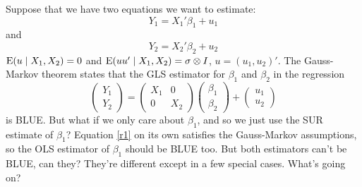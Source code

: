 \begin{hw}
  Suppose that we have two equations we want to estimate:
  \begin{equation}
    \label{r1}
    Y_1 = X_1 '\beta_1 + u_1
  \end{equation}
  and
  \begin{equation}
    \label{r2}
    Y_2 = X_2'\beta_2 + u_2
  \end{equation}
  $\operatorname{E}(u \mid X_1, X_2) = 0$ and $\operatorname{E}(u u' \mid X_1, X_2) = \sigma
  \otimes I$, $u = (u_1, u_2)'$. The Gauss-Markov theorem states that
  the GLS estimator for $\beta_1$ and $\beta_2$ in the regression
  \begin{equation}
    \label{r3}
    \begin{pmatrix} Y_1 \\ Y_2 \end{pmatrix}
    = \begin{pmatrix} X_1 & 0 \\ 0 & X_2 \end{pmatrix} 
    \begin{pmatrix} \beta_1 \\ \beta_2 \end{pmatrix}
    + \begin{pmatrix} u_1 \\ u_2 \end{pmatrix}
  \end{equation}
  is BLUE. But what if we only care about $\beta_1$, and so we just
  use the SUR estimate of $\beta_1$? Equation \eqref{r1} on its own
  satisfies the Gauss-Markov assumptions, so the OLS estimator of
  $\beta_1$ should be BLUE too. But both estimators can't be BLUE,
  can they? They're different except in a few special cases. What's
  going on?
\end{hw}

